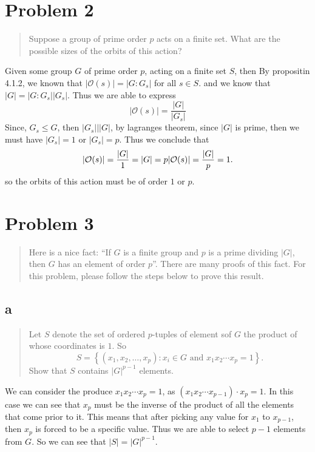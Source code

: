\hypertarget{problem-2}{%
\section{Problem 2}\label{problem-2}}

\begin{quote}
Suppose a group of prime order \(p\) acts on a finite set. What are the
possible sizes of the orbits of this action?
\end{quote}

Given some group \(G\) of prime order \(p\), acting on a finite set
\(S\), then By propositin 4.1.2, we known that
\(|\mathcal{O}(s)|=|G:G_s|\) for all \(s\in S\). and we know that
\(|G|=|G:G_s||G_s|\). Thus we are able to express \[
|\mathcal{O}(s)|=\frac{|G|}{|G_s|}
\] Since, \(G_s\leq G\), then \(|G_s|\big\vert |G|\), by lagranges
theorem, since \(|G|\) is prime, then we must have \(|G_s|=1\) or
\(|G_s|=p\). Thus we conclude that \[
|\mathcal{O}(s)|=\frac{|G|}{1}=|G|=p\\
|\mathcal{O}(s)|=\frac{|G|}{p}=1.
\] so the orbits of this action must be of order \(1\) or \(p\).

\hypertarget{problem-3}{%
\section{Problem 3}\label{problem-3}}

\begin{quote}
Here is a nice fact: ``If \(G\) is a finite group and \(p\) is a prime
dividing \(|G|\), then \(G\) has an element of order \(p\)''. There are
many proofs of this fact. For this problem, please follow the steps
below to prove this result.
\end{quote}

\hypertarget{a-1}{%
\subsection{a}\label{a-1}}

\begin{quote}
Let \(S\) denote the set of ordered \(p\)-tuples of element sof \(G\)
the product of whose coordinates is \(1\). So \[
S=\left\{(x_1,x_2,\ldots,x_p):x_i\in G \text{ and } x_1x_2\cdots x_p=1\right\}.
\] Show that \(S\) contains \(|G|^{p-1}\) elements.
\end{quote}

We can consider the produce \(x_1x_2\cdots x_p=1\), as
\((x_1x_2\cdots x_{p-1})\cdot x_p=1\). In this case we can see that
\(x_p\) must be the inverse of the product of all the elements that come
prior to it. This means that after picking any value for \(x_1\) to
\(x_{p-1}\), then \(x_p\) is forced to be a specific value. Thus we are
able to select \(p-1\) elements from \(G\). So we can see that
\(|S|=|G|^{p-1}\).

